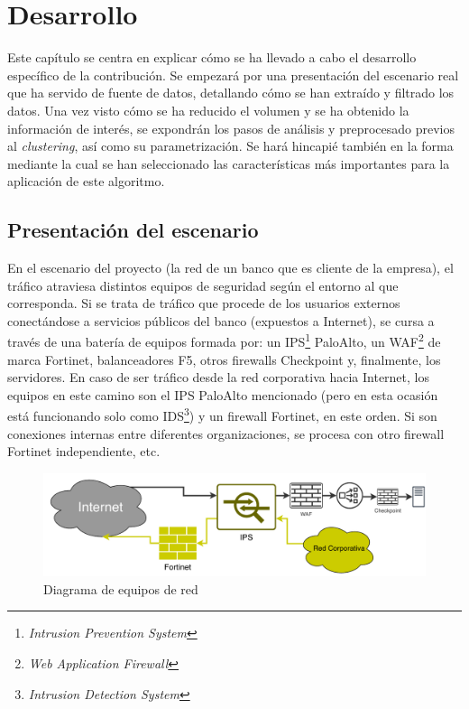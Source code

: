 \chapter{Desarrollo}\label{chap:desarrollo}

Este capítulo se centra en explicar cómo se ha llevado a cabo el desarrollo específico de la contribución.
Se empezará por una presentación del escenario real que ha servido de fuente de datos, detallando cómo se han extraído y filtrado los datos.
Una vez visto cómo se ha reducido el volumen y se ha obtenido la información de interés, se expondrán los pasos de análisis y preprocesado previos al \emph{clustering}, así como su parametrización.
Se hará hincapié también en la forma mediante la cual se han seleccionado las características más importantes para la aplicación de este algoritmo.

\section{Presentación del escenario}\label{sec:presentaciondelescenario}

En el escenario del proyecto (la red de un banco que es cliente de la empresa), el tráfico atraviesa distintos equipos de seguridad según el entorno al que corresponda.
Si se trata de tráfico que procede de los usuarios externos conectándose a servicios públicos del banco (expuestos a Internet), se cursa a través de una batería de equipos formada por:
un IPS\footnote{\emph{Intrusion Prevention System}} PaloAlto, un WAF\footnote{\emph{Web Application Firewall}} de marca Fortinet, balanceadores F5, otros firewalls Checkpoint y, finalmente, los servidores.
En caso de ser tráfico desde la red corporativa hacia Internet, los equipos en este camino son el IPS PaloAlto mencionado (pero en esta ocasión está funcionando solo como IDS\footnote{\emph{Intrusion Detection System}}) y un firewall Fortinet, en este orden.
Si son conexiones internas entre diferentes organizaciones, se procesa con otro firewall Fortinet independiente, etc.

\begin{figure}[h]
    \centering
    \captionsetup{width=10cm}
    \includegraphics[width=12cm]{contenido/fig/diagrama_red.pdf}
    \caption{Diagrama de equipos de red}
    \label{fig:diagramared}
\end{figure}


